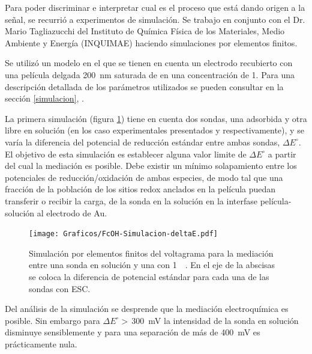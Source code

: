		Para poder discriminar e interpretar cual es el proceso que está dando origen a la señal, se recurrió a experimentos de simulación. Se trabajo en conjunto con el Dr. Mario Tagliazucchi del Instituto de Química Física de los Materiales, Medio Ambiente y Energía (INQUIMAE) haciendo simulaciones por elementos finitos.

		Se utilizó un modelo en el que se tienen en cuenta un electrodo recubierto con una película delgada \SI{200}{nm} saturada de  \aminorutenio en una concentración de \SI{1}{\Molar}. Para una descripción detallada de los parámetros utilizados se pueden consultar en la sección \ref{simulacion}, \pageref{simulacion}. 

		La primera simulación (figura \ref{fig:sim_mediacion}) tiene en cuenta dos sondas, una adsorbida y otra libre en solución (en los caso experimentales presentados \ru\space y \fc\space respectivamente), y se varía la diferencia del potencial de reducción estándar entre ambas sondas, $\Delta E^\circ$. El objetivo de esta simulación es establecer alguna valor limite de $\Delta E^\circ$ a partir del cual la mediación es posible. Debe existir un mínimo solapamiento entre los potenciales de reducción/oxidación de ambas especies, de modo tal que una fracción de la población de los sitios redox anclados en la película puedan transferir o recibir la carga, de la sonda en la solución en la interfase película-solución al electrodo de Au.

			\begin{figure}[ht]
					\centering
			 	    \texttt{[image: Graficos/FcOH-Simulacion-deltaE.pdf]}
			        \vspace*{-2mm}
			        \caption[Simulación EQ de mediación redox]{Simulación por elementos finitos del voltagrama para la mediación entre una sonda en solución y una \pdmF\space con \ru\space \SI{1}{\milli\Molar}. En el eje de la abscisas se coloca la diferencia de potencial estándar para cada una de las sondas con ESC.}
			        \label{fig:sim_mediacion}
			      	\end{figure}

		Del análisis de la simulación se desprende que la mediación electroquímica es posible. Sin embargo para $\Delta E^\circ\!\!>\,$\SI{300}{\milli\volt} la intensidad de la sonda en solución disminuye sensiblemente y para una separación de más de \SI{400}{\milli\volt} es prácticamente nula. 

